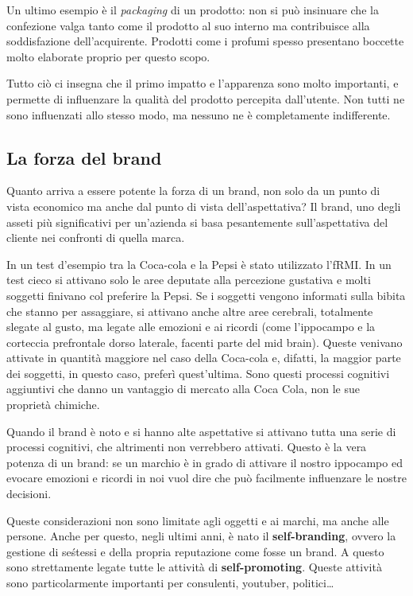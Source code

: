 Un ultimo esempio è il \emph{packaging} di un prodotto: non si può insinuare
che la confezione valga tanto come il prodotto al suo interno ma contribuisce
alla soddisfazione dell'acquirente. Prodotti come i profumi spesso presentano
boccette molto elaborate proprio per questo scopo.

Tutto ciò ci insegna che il primo impatto e l'apparenza sono molto importanti,
e permette di influenzare la qualità del prodotto percepita dall'utente. Non
tutti ne sono influenzati allo stesso modo, ma nessuno ne è completamente
indifferente.

\subsection{La forza del brand}

Quanto arriva a essere potente la forza di un brand, non solo da un punto di
vista economico ma anche dal punto di vista dell'aspettativa?
Il brand, uno degli asseti più significativi per un'azienda si basa
pesantemente sull'aspettativa del cliente nei confronti di quella marca.

In un test d'esempio tra la Coca-cola e la Pepsi è stato utilizzato l'fRMI. In
un test cieco si attivano solo le aree deputate alla percezione gustativa e
molti soggetti finivano col preferire la Pepsi. Se i soggetti vengono
informati sulla bibita che stanno per assaggiare, si attivano anche altre
aree cerebrali, totalmente slegate al gusto, ma legate alle emozioni e ai
ricordi (come l'ippocampo e la corteccia prefrontale dorso laterale, facenti
parte del mid brain). Queste venivano attivate in quantità maggiore nel caso
della Coca-cola e, difatti, la maggior parte dei soggetti, in questo caso,
preferì quest'ultima. Sono questi processi cognitivi aggiuntivi che danno un
vantaggio di mercato alla Coca Cola, non le sue proprietà chimiche.

Quando il brand è noto e si hanno alte aspettative si attivano tutta una serie
di processi cognitivi, che altrimenti non verrebbero attivati. Questo è la vera
potenza di un brand: se un marchio è in grado di attivare il nostro ippocampo
ed evocare emozioni e ricordi in noi vuol dire che può facilmente influenzare
le nostre decisioni.

Queste considerazioni non sono limitate agli oggetti e ai marchi, ma anche alle
persone. Anche per questo, negli ultimi anni, è nato il \textbf{self-branding}, ovvero la gestione di se\' stessi e della propria reputazione come fosse un brand. A questo sono strettamente legate tutte le attività di \textbf{self-promoting}. Queste attività sono particolarmente importanti per consulenti, youtuber, politici\dots{}

